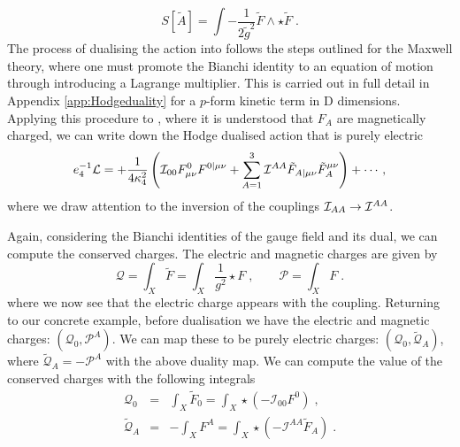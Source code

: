 \begin{equation}
\label{eq:maxwelldualgen}
S[\tilde{A}] = \int - \frac{1}{2 \tilde{g}^2} \tilde{F} \wedge \star \tilde{F} \;.
\end{equation}
The process of dualising the action  into  follows the steps outlined for the Maxwell theory, where one must promote the Bianchi identity to an equation of motion through introducing a Lagrange multiplier. This is carried out in full detail in Appendix \ref{app:Hodgeduality} for a $p$-form kinetic term in D dimensions. Applying this procedure to , where it is understood that $F_A$ are magnetically charged, we can write down the Hodge dualised action that is purely electric
\begin{equation*}
 e_4^{-1} {\cal L} =  
 + \frac{1}{4 \kappa_4^2} \left(  {\cal I}_{00} F^0_{\mu \nu} F^{0|\mu \nu} 
+ \sum_{A=1}^3  {\cal I}^{AA} \tilde{F}_{A | \mu \nu} \tilde{F}_A^{\mu \nu} \right) + \cdots,
\end{equation*}
where we draw attention to the inversion of the couplings ${\cal I}_{AA} \rightarrow {\cal I}^{AA}$.

Again, considering the Bianchi identities of the gauge field and its dual, we can compute the conserved charges. The electric and magnetic charges are given by
\begin{equation}
\label{eq:charges}
\mathcal{Q} =  \int_X \tilde{F}  = \int_X \frac{1}{g^2} \star F \;, \qquad
\mathcal{P} =  \int_X F \;.
\end{equation}
where we now see that the electric charge appears with the coupling. Returning to our concrete example, before dualisation we have the electric and magnetic charges: $(\mathcal{Q}_0, \mathcal{P}^A)$. We can map these to be purely electric charges: $(\mathcal{Q}_0, \tilde{\mathcal{Q}}_A)$, where $\tilde{\mathcal{Q}}_A=-\mathcal{P}^A$ with the above duality map. We can compute the value of the conserved charges with the following integrals
\begin{eqnarray}
\mathcal{Q}_0 &=&  \int_X \tilde{F}_0 =  \int_X 
\star \left( - \mathcal{I}_{00}  F^0\right)\;, \\
\tilde{\mathcal{Q}}_A &=& - \int_X F^A =
 \int_X \star \left( - \mathcal{I}^{AA} \tilde{F}_A \right) \;.
\end{eqnarray}



